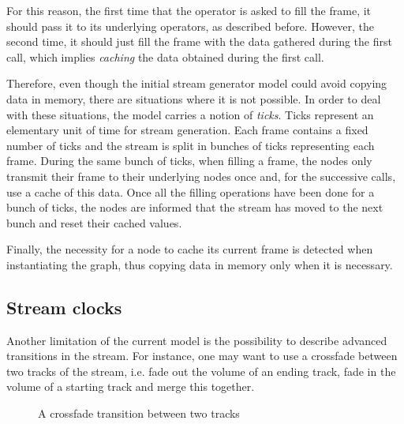 \documentclass{llncs}
\newcommand{\ie}{{i.e.}}
\begin{document}
For this reason, the first time that the operator is asked to fill the frame, it should pass it to its 
underlying operators, as described before. However, the second time, it should just fill the frame 
with the data gathered during the first call, which implies \textit{caching} the data obtained during the first call.

Therefore, even though the initial stream generator model could avoid copying data in memory, there 
are situations where it is not possible. In order to deal with these situations, the 
model carries a notion of \textit{ticks}. Ticks represent an elementary unit of time
for stream generation. Each frame contains a fixed number of ticks and the stream is split
in bunches of ticks representing each frame. During the same bunch of ticks, when filling a frame, the nodes only 
transmit their frame to their underlying nodes once and, for the successive calls, use a cache of this data. 
Once all the filling operations have been done for a bunch of ticks, the nodes are informed that the 
stream has moved to the next bunch and reset their cached values. 

Finally, the necessity for a node to cache its current frame is detected when instantiating the graph, thus
copying data in memory only when it is necessary.

\subsection*{Stream clocks}


Another limitation of the current model is the possibility to describe advanced transitions in 
the stream. For instance, one may want to use a crossfade between two tracks 
of the stream, \ie{}
fade out the volume of an ending track, fade in the volume of a starting track and merge this together.

\begin{figure}[htn]
 \begin{center}
\end{center}
 \caption{A crossfade transition between two tracks}
 \label{cross-fig}
\end{figure}
\end{document}
